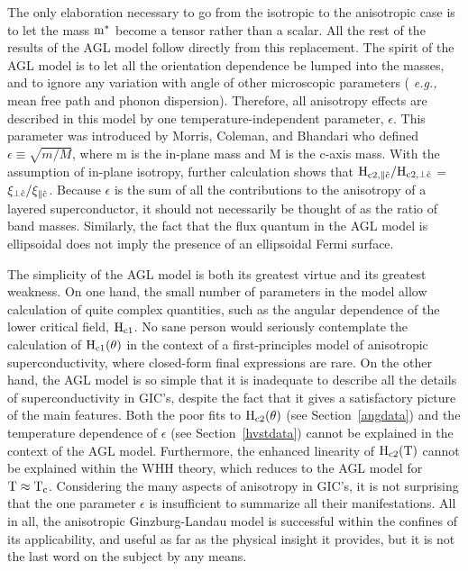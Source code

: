         The only elaboration  necessary  to go from  the  isotropic to  the
anisotropic case is to let the mass $\rm m^*$ become a tensor rather than a
scalar.\cite{tilley65,kats69}  All the  rest  of the results of the AGL
model follow directly  from this replacement.  The spirit  of the AGL model
is to let all the orientation dependence be lumped into the  masses, and to
ignore  any variation  with  angle  of other  microscopic parameters  ({\em
e.g.,\/} mean free path and phonon  dispersion).  Therefore, all anisotropy
effects are   described  in  this    model  by one  temperature-independent
parameter, $\epsilon$.  This parameter  was introduced by  Morris, Coleman,
and Bhandari\cite{morris72} who defined $\epsilon \equiv \sqrt{m/M}$, where
m is the in-plane mass  and M is the c-axis  mass.  With  the assumption of
in-plane isotropy, further   calculation shows that  $\rm H_{c2,  \parallel
\hat{c}}/H_{c2, \perp \hat{c}}$ = $\rm \xi_{\perp \hat{c}}/\xi_{\parallel
\hat{c}}$.  Because $\epsilon$ is the  sum of   all the  contributions to  
the anisotropy of  a layered  superconductor, it should not  necessarily be
thought of as the ratio of band masses.  Similarly, the  fact that the flux
quantum in the AGL model is ellipsoidal  does not imply  the presence of an
ellipsoidal Fermi surface.

        The simplicity of the AGL model is both its greatest virtue and its
greatest weakness.   On  one hand, the small  number  of parameters  in the
model  allow calculation of  quite complex quantities, such as  the angular
dependence of the lower critical field, $\rm H_{c1}$.\cite{klemm80} No sane
person would seriously contemplate the calculation of  $\rm H_{c1}(\theta)$
in     the  context     of   a   first-principles   model    of anisotropic
superconductivity,  where closed-form final  expressions are   rare.
On the  other hand, the AGL  model is so simple   that  it is inadequate to
describe  all the details  of superconductivity in  GIC's,  despite the fact
that it gives a satisfactory picture of the main features.   Both the poor
fits    to   $\rm  H_{c2}(\theta)$  (see    Section~\ref{angdata})  and the
temperature dependence of $\epsilon$ (see Section~\ref{hvstdata}) cannot be
explained in  the context  of  the AGL  model.  Furthermore,  the  enhanced
linearity of $\rm H_{c2}(T)$  cannot  be explained  within the  WHH theory,
which    reduces    to     the   AGL     model     for   $\rm    T  \approx
T_c$.\cite{gorkov59,fetter69}   Considering   the  many aspects   of
anisotropy in GIC's\cite{I94}, it is not surprising that the  one parameter
$\epsilon$ is   insufficient to summarize all  their manifestations.  All in
all,  the  anisotropic  Ginzburg-Landau   model is  successful  within  the
confines of its applicability, and useful as far as the physical insight it
provides, but it is not the last word on the subject by any means.

